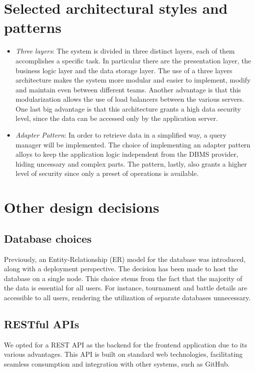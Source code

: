 \documentclass[12pt, a4paper]{report}
\begin{document}
    \section{Selected architectural styles and patterns}
    \begin{itemize}
        \item \textit{Three layers}: The system is divided in three distinct layers,
        each of them accomplishes a specific task.
        In particular there are the presentation layer, the business logic layer and the data storage layer.
        The use of a three layers architecture makes the system more modular and easier to implement, modify and maintain
        even between different teams.
        Another advantage is that this modularization allows the use of load balancers between the various servers.
        One last big advantage is that this architecture grants a high data security level, since the data can be accessed only by
        the application server.
        \item \textit{Adapter Pattern}: In order to retrieve data in a simplified way, a query manager will be implemented.
        The choice of implementing an adapter pattern alloys to keep the application logic independent from the DBMS provider,
        hiding uncessary and complex parts. 
        The pattern, lastly, also grants a higher level of security since only a preset of operations is available.
    \end{itemize}

\newpage 
    \section{Other design decisions}
        \subsection{Database choices}
        Previously, an Entity-Relationship (ER) model for the database was introduced, along with a deployment perspective.
        The decision has been made to host the database on a single node.
        This choice stems from the fact that the majority of the data is essential for all users.
        For instance, tournament and battle details are accessible to all users, rendering the utilization of separate databases unnecessary.
        \subsection{RESTful APIs}
        We opted for a REST API as the backend for the frontend application due to its various advantages.
        This API is built on standard web technologies, facilitating seamless consumption and integration with other systems, such as GitHub.
    \newpage 
\end{document}
